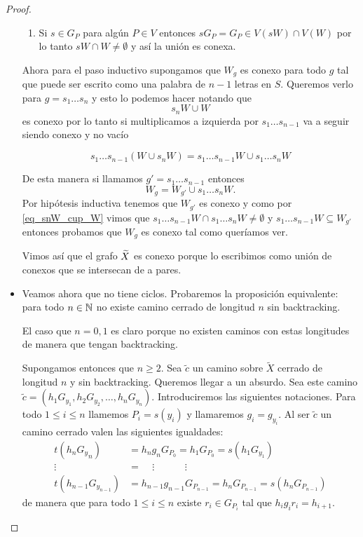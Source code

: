 \documentclass[tesis.tex]{subfiles}
\begin{document}
\begin{proof}
\begin{itemize}
\begin{enumerate}
			\item Si $s \in G_P$ para algún $P \in V$ entonces $s G_P = G_P \in V(sW) \cap V(W)$ por lo tanto $sW \cap W \neq \emptyset$ y así la unión es conexa.
		\end{enumerate} 
		
		Ahora para el paso inductivo supongamos que $W_{g}$ es conexo para todo $g$ tal que puede ser escrito como una palabra de $n-1$ letras en $S$. 
		Queremos verlo para $g = s_1\dots s_n$ y esto lo podemos hacer notando que		
		\[
			s_{n} W \cup W
		\]
		es conexo por lo tanto si multiplicamos a izquierda por $s_{1} \dots s_{n-1}$ va a seguir siendo conexo y no vacío
		
		\begin{equation}\label{eq_snW_cup_W}
			s_{1} \dots s_{n-1} (W \cup s_{n} W) = s_{1} \dots s_{n-1} W \cup s_{1} \dots s_{n}W
		\end{equation}
		
		De esta manera si llamamos $g' = s_{1} \dots s_{n-1}$ entonces
		\[
		W_{g} = W_{g'} \cup s_{1}\dots s_{n}W.
		\]
		Por hipótesis inductiva tenemos que $W_{g'}$ es conexo y como por \ref{eq_snW_cup_W} vimos que $s_{1} \dots s_{n-1} W \cap s_{1} \dots s_{n}W \neq \emptyset$  
		y $s_{1} \dots s_{n-1} W \subseteq W_{g'}$ entonces probamos que $W_{g}$ es conexo tal como queríamos ver.
		
		
		
		Vimos así que el grafo $\widetilde X$ es conexo porque lo escribimos como unión de conexos que se intersecan de a pares.
		
		
		\item 
		Veamos ahora que no tiene ciclos.
		Probaremos la proposición equivalente: para todo $n \in \mathbb{N}$ no existe camino cerrado de longitud $n$ sin backtracking.
		
		El caso que $n=0,1$ es claro porque no existen caminos con estas longitudes de manera que tengan backtracking.
		
		Supongamos entonces que $n \ge 2$.
		Sea $\widetilde c$ un camino sobre $\widetilde X$ cerrado de longitud $n$ y sin backtracking.
		Queremos llegar a un absurdo.
		Sea este camino $\widetilde c = (h_1G_{y_1}, h_2 G_{y_2}, \dots, h_n G_{y_n})$.
		Introduciremos las siguientes notaciones.
		Para todo $1 \le i \le n$ llamemos $P_{i} = s(y_i)$ y llamaremos $g_i = g_{y_i}$.
		Al ser $\widetilde c$ un camino cerrado valen las siguientes igualdades:
		\begin{align*}
			t(h_n{G_y}_n) &= h_ng_nG_{P_0} = h_1G_{P_0} = s(h_1G_{ y_1}) \\ 
			\vdots \ \ \  &= \ \ \ \ \    \vdots\ \ \ \ \ \ \ \ \ \ \ \ \ \    \vdots \\
			t(h_{n-1}G_{y_{n-1}}) &= h_{n-1}g_{n-1}G_{P_{n-1}} = h_{n}G_{P_{n-1}} = s(h_nG_{P_{n-1}} )  
		\end{align*}
		de manera que para todo $1 \le i \le n$ existe $r_i \in G_{P_i}$ tal que $h_ig_ir_i = h_{i+1}$. 	
		

\end{itemize}
\end{proof}
\end{document}
